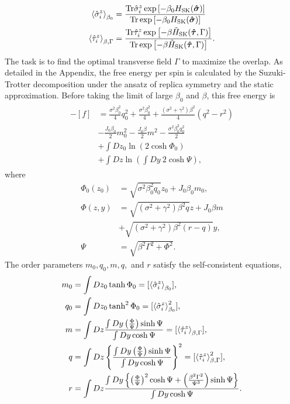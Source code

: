 \documentclass[aps,pra,twocolumn,groupedaddress,longbibliography]{revtex4}
\def\v#1{\mbox{\boldmath $#1$}}
\newcommand{\Sig}{\sigma}
\begin{document}
\begin{align}
	\braket{\hat{\Sig}_{i}^z}_{\beta_0} &= \frac{\mathrm{Tr}\hat{\Sig}_{i}^z \exp \left[-\beta_0 H_{\mathrm{SK}}(\v{\hat{\Sig}})\right]}{\mathrm{Tr}\exp \left[-\beta_0 H_{\mathrm{SK}}(\v{\hat{\Sig}})\right]} \\
	\braket{\hat{\tau}_{i}^z}_{\beta, \Gamma} &= \frac{\mathrm{Tr}\hat{\tau}_{i}^z \exp \left[-\beta \tilde{H}_{\mathrm{SK}}(\v{\hat{\tau}}, \Gamma)\right]}{\mathrm{Tr}\exp \left[-\beta \tilde{H}_{\mathrm{SK}}(\v{\hat{\tau}}, \Gamma)\right]}. 
\end{align}
The task is to find the optimal transverse field $\Gamma$ to maximize the overlap. As detailed in the Appendix, the free energy per spin is calculated by the Suzuki-Trotter decomposition under the ansatz of replica symmetry and the static approximation. Before taking the limit of large $\beta_0$ and $\beta$, this free energy is 
\begin{align}
	\label{eq:feps}
	\begin{split}
		-[f] &= \frac{\sigma^2 \beta_0^2}{4}q_0^2 + \frac{\sigma^2 \beta_0^2}{4} + \frac{(\sigma^2+\gamma^2)\beta^2}{4}(q^2-r^2)  \\
		&-\frac{J_0 \beta_0}{2}m_0^2-\frac{J_0 \beta}{2}m^2-\frac{\sigma^2 \beta_0^2 q_0^2}{2} \\
		&+ \int Dz_0 \ln(2\cosh{\Phi_0})  \\
		&+ \int Dz \ln\left(\int Dy \ 2\cosh{\Psi}\right),
	\end{split}
\end{align}
where
\begin{align}
	\Phi_0(z_0) &= \sqrt{\sigma^2 \beta_0^2 q_0}z_0 + J_0 \beta_0 m_0, \\
	\Phi(z,y) &= \sqrt{(\sigma^2+\gamma^2) \beta^2 q}z + J_0 \beta m \nonumber \\&+ \sqrt{(\sigma^2+\gamma^2)\beta^2(r-q)}y, \\
	\Psi &= \sqrt{\beta^2\Gamma^2+\Phi^2}.
\end{align}
The order parameters $m_0, q_0, m, q, $ and $r$ satisfy the self-consistent equations,
\begin{align}
	m_0 &= \int Dz_0 \tanh{\Phi_0} = [\braket{\hat{\Sig}_i^z}_{\beta_0}], \\
		q_0 &= \int Dz_0 \tanh^2{\Phi_0} = [\braket{\hat{\Sig}_i^z}_{\beta_0}^2], \\
		m &= \int Dz \frac{\int Dy \left(\frac{\Phi}{\Psi}\right)\sinh{\Psi}}{\int Dy \cosh \Psi} = [\braket{\hat{\tau}_{i}^z}_{\beta, \Gamma}], \\
		q &= \int Dz \left\{\frac{\int Dy \left(\frac{\Phi}{\Psi}\right)\sinh{\Psi}}{\int Dy \cosh \Psi}\right\}^2 = [\braket{\hat{\tau}_{i}^z}_{\beta, \Gamma}^2], \\
		r &= \int Dz \frac{\int Dy \left\{\left(\frac{\Phi}{\Psi}\right)^2\cosh{\Psi}+\left(\frac{\beta^2 \Gamma^2}{\Psi^3}\right) \sinh{\Psi}\right\}}{\int Dy \cosh \Psi}.
\end{align}
\end{document}
